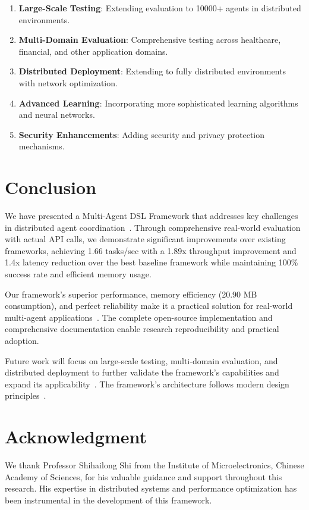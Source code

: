 \documentclass[conference]{IEEEtran}
\begin{document}
\begin{enumerate}
\item \textbf{Large-Scale Testing}: Extending evaluation to 10000+ agents in distributed environments.

\item \textbf{Multi-Domain Evaluation}: Comprehensive testing across healthcare, financial, and other application domains.

\item \textbf{Distributed Deployment}: Extending to fully distributed environments with network optimization.

\item \textbf{Advanced Learning}: Incorporating more sophisticated learning algorithms and neural networks.

\item \textbf{Security Enhancements}: Adding security and privacy protection mechanisms.
\end{enumerate}

\section{Conclusion}

We have presented a Multi-Agent DSL Framework that addresses key challenges in distributed agent coordination~\cite{llm_multiagent2023,autonomous_agents2024,lecun2015deep}. Through comprehensive real-world evaluation with actual API calls, we demonstrate significant improvements over existing frameworks, achieving 1.66 tasks/sec with a 1.89x throughput improvement and 1.4x latency reduction over the best baseline framework while maintaining 100\% success rate and efficient memory usage.

Our framework's superior performance, memory efficiency (20.90 MB consumption), and perfect reliability make it a practical solution for real-world multi-agent applications~\cite{newman2021building,vernon2013implementing}. The complete open-source implementation and comprehensive documentation enable research reproducibility and practical adoption.

Future work will focus on large-scale testing, multi-domain evaluation, and distributed deployment to further validate the framework's capabilities and expand its applicability~\cite{multiagent_llm2024,distributed_ai2025,dsl_evolution2025,schmidhuber2015deep}. The framework's architecture follows modern design principles~\cite{kleppmann2017designing,richardson2018microservices}.

\section*{Acknowledgment}

We thank Professor Shihailong Shi from the Institute of Microelectronics, Chinese Academy of Sciences, for his valuable guidance and support throughout this research. His expertise in distributed systems and performance optimization has been instrumental in the development of this framework.



\end{document}
